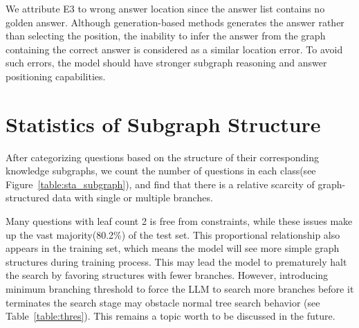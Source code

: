 \documentclass[11pt]{article}
\begin{document}
We attribute E3 to wrong answer location since the answer list contains no golden answer. Although generation-based methods generates the answer rather than selecting the position, the inability to infer the answer from the graph containing the correct answer is considered as a similar location error. To avoid such errors, the model should have stronger subgraph reasoning and answer positioning capabilities.


\section{Statistics of Subgraph Structure}
\label{appendix:sta_subgraph}

After categorizing questions based on the structure of their corresponding knowledge subgraphs, we count the number of questions in each class(see Figure~\ref{table:sta_subgraph}), and find that there is a relative scarcity of graph-structured data with single or multiple branches.

Many questions with leaf count 2 is free from constraints, while these issues make up the vast majority(80.2\%) of the test set. This proportional relationship also appears in the training set, which means the model will see more simple graph structures during training process. This may lead the model to prematurely halt the search by favoring structures with fewer branches. However, introducing minimum branching threshold to force the LLM to search more branches before it terminates the search stage may obstacle normal tree search behavior (see Table~\ref{table:thres}). This remains a topic worth to be discussed in the future.
\end{document}
